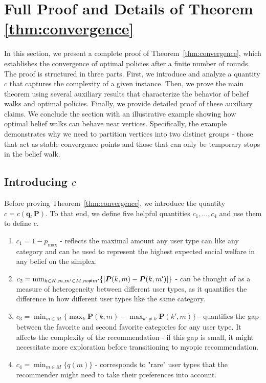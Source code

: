 \section{Full Proof and Details of Theorem \ref{thm:convergence}}
\label{sec:convergence-of-the-optimal-policy-proofs}
In this section, we present a complete proof of Theorem~\ref{thm:convergence}, which establishes the convergence of optimal policies after a finite number of rounds. The proof is structured in three parts. First, we introduce and analyze a quantity $c$ that captures the complexity of a given instance. Then, we prove the main theorem using several auxiliary results that characterize the behavior of belief walks and optimal policies. Finally, we provide detailed proof of these auxiliary claims. We conclude the section with an illustrative example showing how optimal belief walks can behave near vertices. Specifically, the example demonstrates why we need to partition vertices into two distinct groups - those that act as stable convergence points and those that can only be temporary stops in the belief walk.


\subsection{Introducing $c$}

Before proving Theorem~\ref{thm:convergence}, we introduce the quantity $c = c(\bm q, \bm P)$. To that end, we define five helpful quantities $c_1, \ldots, c_4$ and use them to define $c$.

\begin{enumerate}
    \item $c_1 = 1 - p_{\max}$ - reflects the maximal amount any user type can like any category and can be used to represent the highest expected social welfare in any belief on the simplex.
    \item $c_2 = \min_{k \in K, m, m' \in M, m \neq m'} \{ \lvert\bm{P}(k, m) - \bm{P}(k, m') \rvert \}$ - can be thought of as a measure of heterogeneity between different user types, as it quantifies the difference in how different user types like the same category.
    \item $c_3 = \min_{m \in M} \{ \max_{k} \bm{P}(k, m)  - \max_{k' \neq k} \bm{P}(k', m) \}$ - quantifies the gap between the favorite and second favorite categories for any user type. It affects the complexity of the recommendation - if this gap is small, it might necessitate more exploration before transitioning to myopic recommendation.
    \item $c_4 = \min_{m \in M} \{ q(m) \}$ - corresponds to "rare" user types that the recommender might need to take their preferences into account.
\end{enumerate}

